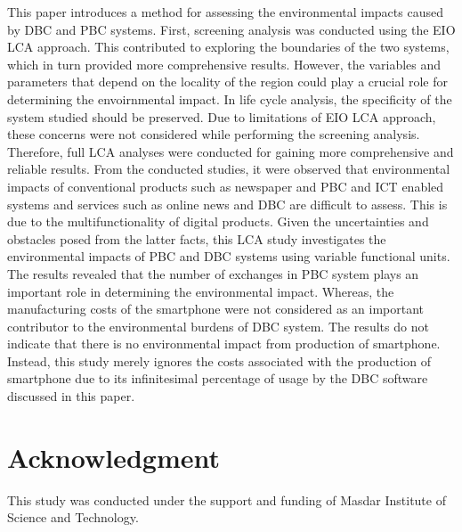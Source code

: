 \documentclass[conference]{IEEEtran}
\begin{document}
This paper introduces a method for assessing the environmental impacts caused by DBC and PBC systems. First, screening analysis was conducted using the EIO LCA approach. This contributed to exploring the boundaries of the two systems, which in turn provided more comprehensive results. However, the variables and parameters that depend on the locality of the region could play a crucial role for determining the envoirnmental impact. In life cycle analysis, the specificity of the system studied should be preserved. Due to limitations of EIO LCA approach, these concerns were not considered while performing the screening analysis. Therefore, full LCA analyses were conducted for gaining more comprehensive and reliable results. From the conducted studies, it were observed that environmental impacts of conventional products such as newspaper and PBC and ICT enabled systems and services such as online news and DBC are difficult to assess. This is due to the multifunctionality of digital products. Given the uncertainties and obstacles posed from the latter facts, this LCA study investigates the environmental impacts of PBC and DBC systems using variable functional units. The results revealed that the number of exchanges in PBC system plays an important role in determining the environmental impact. Whereas, the manufacturing costs of the smartphone were not considered as an important contributor to the environmental burdens of DBC system. The results do not indicate that there is no environmental impact from production of smartphone. Instead, this study merely ignores the costs associated with the production of smartphone due to its infinitesimal percentage of usage by the DBC software discussed in this paper.

\section*{Acknowledgment}

This study was conducted under the support and funding of Masdar Institute of Science and Technology.

\end{document}
